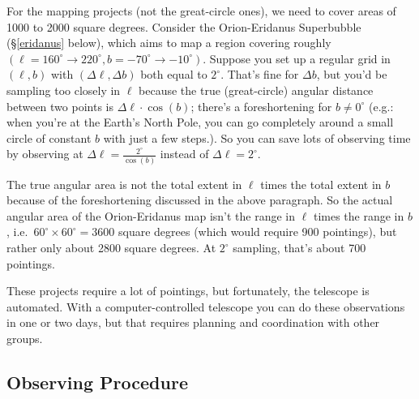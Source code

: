 \documentclass[psfig,preprint]{aastex}
\begin{document}
For the mapping projects (not the great-circle ones), we need to cover
areas of 1000 to 2000 square degrees. Consider the Orion-Eridanus
Superbubble (\S \ref{eridanus} below), which aims to map a region
covering roughly $(\ell=160^\circ \rightarrow 220^\circ, b=-70^\circ
\rightarrow -10^\circ)$. Suppose you set up a regular grid in
$(\ell,b)$ with $(\Delta \ell, \Delta b)$ both equal to
$2^\circ$. That's fine for $\Delta b$, but you'd be sampling too closely
in $\ell$ because the true (great-circle) angular distance
between two points is $\Delta \ell \cdot \cos(b)$; there's a
foreshortening for $b \neq 0^\circ$ (e.g.: when you're at the Earth's
North Pole, you can go completely around a small circle of constant $b$
with just a few steps.). So you can save lots of observing time by
observing at $\Delta \ell = \frac{2^\circ}{\cos(b)}$ instead of $\Delta
\ell = 2^\circ$.

The true angular area is not the total extent in $\ell$ times the total
extent in $b$ because of the foreshortening discussed in the above
paragraph. So the actual angular area of the Orion-Eridanus map
isn't the range in $\ell$ times the range in $b$, i.e.\ $60^\circ
\times 60^\circ = 3600$ square degrees (which would require 900
pointings), but rather only about 2800 square degrees.  At $2^\circ$
sampling, that's about 700 pointings.

These projects require a lot of pointings,
but fortunately, the telescope is automated. With a
computer-controlled telescope you can do these observations in one
or two days, but that requires planning and coordination with other
groups.

\subsection{Observing Procedure} \label{mappingcommands}
\end{document}
